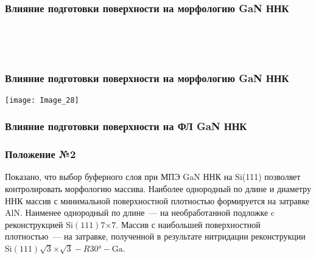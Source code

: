 \begin{frame}
	\frametitle{Влияние подготовки поверхности на морфологию GaN ННК}
	\centering
	\begin{minipage}[t]{0.31\linewidth}
	\end{minipage}
	\\
	\bigskip
	\begin{minipage}[t]{0.31\linewidth}
	\end{minipage}
	\begin{minipage}[t]{0.31\linewidth}
	\end{minipage}
	\begin{minipage}[t]{0.31\linewidth}
	\end{minipage}
	\\
	\bigskip
	\begin{minipage}[t]{0.31\linewidth}
	\end{minipage}
	\begin{minipage}[t]{0.31\linewidth}
	\end{minipage}
	\begin{minipage}[t]{0.31\linewidth}
	\end{minipage}
\end{frame}

\begin{frame}
	\frametitle{Влияние подготовки поверхности на морфологию GaN ННК}
	\centering
	\texttt{[image: Image\_28]}
\end{frame}

\begin{frame}
	\frametitle{Влияние подготовки поверхности на ФЛ GaN ННК}
	\centering
	\begin{minipage}[t]{0.47\linewidth}
	\end{minipage}
	\begin{minipage}[t]{0.47\linewidth}
	\end{minipage}
\end{frame}

\begin{frame}
	\frametitle{Положение №2}
	\large
	Показано, что выбор буферного слоя при МПЭ GaN ННК на Si(111) позволяет
	контролировать морфологию массива. Наиболее однородный по длине и диаметру
	ННК массив с минимальной поверхностной плотностью формируется на затравке
	AlN. Наименее однородный по длине~--- на необработанной подложке c
	реконструкцией Si\((111)7\)\(\times\)\(7\). Массив с наибольшей
	поверхностной плотностью~--- на затравке, полученной в результате нитридации
	реконструкции Si\((111)\sqrt{3}\)\(\times\)\(\sqrt{3} - R30\si{\degree} -
	\text{Ga}\).
\end{frame}

